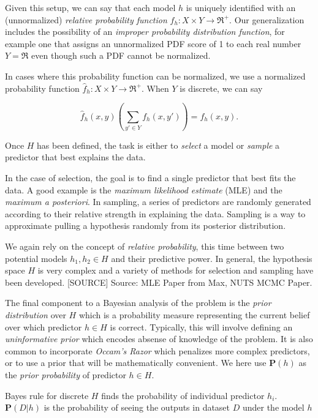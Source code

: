 \documentclass[twoside]{article}
\begin{document}
Given this setup, we can say that each model \(h\) is uniquely identified with an (unnormalized) \textit{relative probability function} \(f_h: X \times Y \rightarrow \Re^+\). Our generalization includes the possibility of an \textit{improper probability distribution function}, for example one that assigns an unnormalized PDF score of 1 to each real number \(Y=\Re\) even though such a PDF cannot be normalized.

In cases where this probability function can be normalized, we use a normalized probability function \(\hat{f}_h: X \times Y \rightarrow \Re^+\). When \(Y\) is discrete, we can say

\begin{equation}
\label{eq:normalized_probability_model}
\hat{f}_h(x, y)\left(\sum_{y' \in Y} f_h(x,y')\right)=f_h(x, y).
\end{equation}

Once \(H\) has been defined, the task is either to \textit{select} a model or \textit{sample} a predictor that best explains the data.

In the case of selection, the goal is to find a single predictor that best fits the data. A good example is the \textit{maximum likelihood estimate} (MLE) and the \textit{maximum a posteriori}. In sampling, a series of predictors are randomly generated according to their relative strength in explaining the data. Sampling is a way to approximate pulling a hypothesis randomly from its posterior distribution.

We again rely on the concept of \textit{relative probability}, this time between two potential models \(h_1, h_2 \in H\) and their predictive power. In general, the hypothesis space \(H\) is very complex and a variety of methods for selection and sampling have been developed. [SOURCE] Source: MLE Paper from Max, NUTS MCMC Paper.

The final component to a Bayesian analysis of the problem is the \textit{prior distribution} over \(H\) which is a probability measure representing the current belief over which predictor \(h \in H\) is correct. Typically, this will involve defining an \textit{uninformative prior} which encodes absense of knowledge of the problem. It is also common to incorporate \textit{Occam's Razor} which penalizes more complex predictors, or to use a prior that will be mathematically convenient. We here use \(\mathbf{P}(h)\) as the \textit{prior probability} of predictor \(h \in H\).

Bayes rule for discrete \(H\) finds the probability of individual predictor \(h_i\). \(\mathbf{P}(D|h)\) is the probability of seeing the outputs in dataset \(D\) under the model \(h\)
\end{document}
